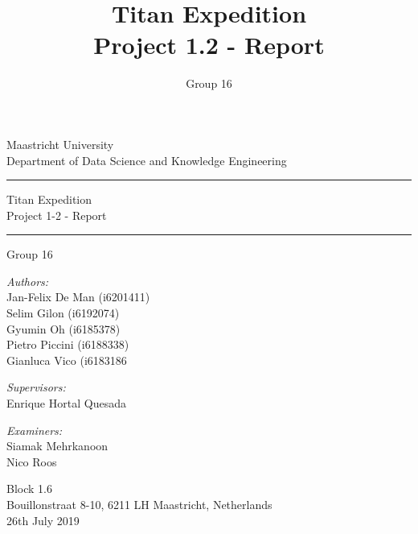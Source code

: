 \documentclass[10pt,a4paper]{article}
\author{Group 16}
\title{Titan Expedition\\ Project 1.2 - Report}
\begin{document}
	\begin{titlepage}    
		\begin{center}    
			{\LARGE Maastricht University}\\
			\vspace{15pt}
			{\large Department of Data Science and Knowledge Engineering}
			\vspace{30pt}
			
			\hrule
			\vspace{15pt}
			{\Large Titan Expedition}\\
			\vspace{15pt}
			{\large Project 1-2 - Report}
			\vspace{15pt}
			\hrule
			
			\vspace{30pt}
			Group 16\\
			\vspace{15pt}
			
			\textit{Authors:}\\
			Jan-Felix De Man (i6201411)\\
			Selim Gilon (i6192074)\\
			Gyumin Oh (i6185378)\\
			Pietro Piccini (i6188338)\\
			Gianluca Vico (i6183186\\            
			\vspace{15pt}
			
			\textit{Supervisors:}\\
			Enrique Hortal Quesada\\
			\vspace{15pt}
			
			\textit{Examiners:}\\
			Siamak Mehrkanoon\\
			Nico Roos\\
			\vspace{15pt}
			
			\vspace*{\fill}
			Block 1.6\\
			Bouillonstraat 8-10, 6211 LH Maastricht, Netherlands\\
			26th July 2019
		\end{center}
	\end{titlepage}
	
	\newpage
\end{document}
